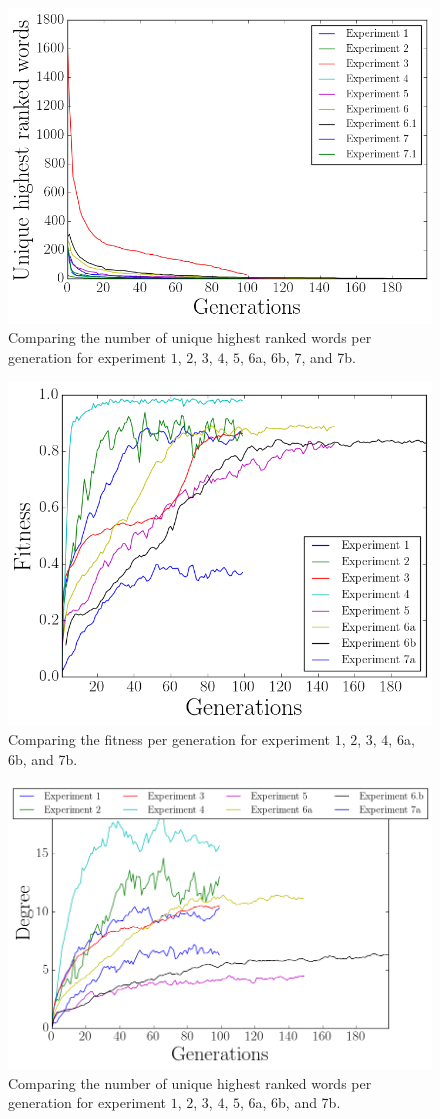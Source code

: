 \begin{figure}
    \centering
    \includegraphics[width=0.7\linewidth]{fig/Discussion/hrwComparison}
    \caption{Comparing the number of unique highest ranked words per generation for experiment $1$, $2$, $3$, $4$, $5$, 6a, 6b, 7, and 7b.}
    \label{fig:hrwComp}
\end{figure}
\begin{figure}
    \centering
    \includegraphics[width=0.7\linewidth]{fig/Discussion/FitnessComparison}
    \caption{Comparing the fitness per generation for experiment $1$, $2$, $3$, $4$, 6a, 6b, and 7b.}
    \label{fig:fitComp}
\end{figure}
\begin{figure}
    \centering
    \includegraphics[width=0.7\linewidth]{fig/Discussion/DegreeComparison}
    \caption{Comparing the number of unique highest ranked words per generation for experiment $1$, $2$, $3$, $4$, $5$, 6a, 6b, and 7b.}
    \label{fig:degreeComp}
\end{figure}

